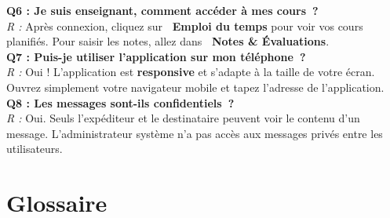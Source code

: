 \documentclass[12pt, a4paper, twoside, openright]{report}
\newcommand{\menu}[1]{\textbf{\textcolor{brandBlue}{\faChevronRight~#1}}}
\begin{document}
\begin{tcolorbox}[colback=bgLight, colframe=brandBlue, rounded corners, title={\faQuestionCircle\quad Questions fréquentes}]
\textbf{Q6 : Je suis enseignant, comment accéder à mes cours~?}\\
\textit{R :} Après connexion, cliquez sur \menu{Emploi du temps} pour voir vos cours planifiés. Pour saisir les notes, allez dans \menu{Notes \& Évaluations}.\\[8pt]

\textbf{Q7 : Puis-je utiliser l'application sur mon téléphone~?}\\
\textit{R :} Oui ! L'application est \textbf{responsive} et s'adapte à la taille de votre écran. Ouvrez simplement votre navigateur mobile et tapez l'adresse de l'application.\\[8pt]

\textbf{Q8 : Les messages sont-ils confidentiels~?}\\
\textit{R :} Oui. Seuls l'expéditeur et le destinataire peuvent voir le contenu d'un message. L'administrateur système n'a pas accès aux messages privés entre les utilisateurs.

\end{tcolorbox}


\chapter{Glossaire}
\label{chap:glossaire}
\end{document}
